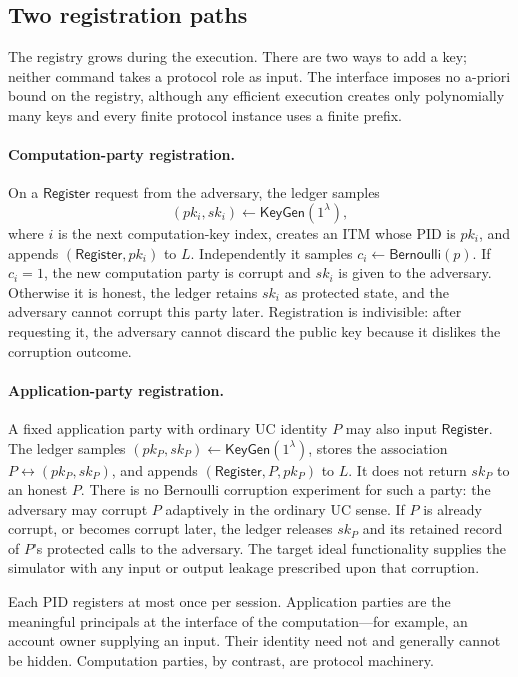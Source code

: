 \subsection{Two registration paths}

The registry grows during the execution. There are two ways to add a key;
neither command takes a protocol role as input. The interface imposes no
a-priori bound on the registry, although any efficient execution creates only
polynomially many keys and every finite protocol instance uses a finite
prefix.

\paragraph{Computation-party registration.}
On a $\mathsf{Register}$ request from the adversary, the ledger samples
\[
  (pk_i,sk_i)\leftarrow\mathsf{KeyGen}(1^\lambda),
\]
where $i$ is the next computation-key index, creates an ITM whose PID is
$pk_i$, and appends $(\mathsf{Register},pk_i)$ to $L$. Independently it
samples $c_i\leftarrow\mathsf{Bernoulli}(p)$. If $c_i=1$, the new
computation party is corrupt and $sk_i$ is given to the adversary. Otherwise
it is honest, the ledger retains $sk_i$ as protected state, and the adversary
cannot corrupt this party later. Registration is indivisible: after
requesting it, the adversary cannot discard the public key because it
dislikes the corruption outcome.

\paragraph{Application-party registration.}
A fixed application party with ordinary UC identity $P$ may also input
$\mathsf{Register}$. The ledger samples
$(pk_P,sk_P)\leftarrow\mathsf{KeyGen}(1^\lambda)$, stores the association
$P\leftrightarrow(pk_P,sk_P)$, and appends
$(\mathsf{Register},P,pk_P)$ to $L$. It does not return $sk_P$ to an honest
$P$. There is no Bernoulli corruption experiment for such a party: the
adversary may corrupt $P$ adaptively in the ordinary UC sense. If $P$ is
already corrupt, or becomes corrupt later, the ledger releases $sk_P$ and
its retained record of $P$'s protected calls to the adversary. The target
ideal functionality supplies the simulator with any input or output leakage
prescribed upon that corruption.

Each PID registers at most once per session. Application parties are the
meaningful principals at the interface of the computation---for example, an
account owner supplying an input. Their identity need not and generally
cannot be hidden. Computation parties, by contrast, are protocol machinery.

